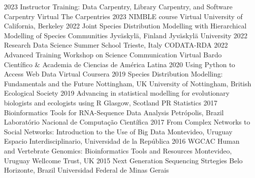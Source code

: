 \documentclass[9pt]{developercv} %
\begin{document}


\begin{entrylist}
	\entrylong
		{2023}
		{Instructor Training: Data Carpentry, Library Carpentry, and Software Carpentry}
		{Virtual}
		{The Carpentries}
	\entrylong
		{2023}
		{NIMBLE course}
		{Virtual}
		{University of California, Berkeley}
	\entrylong
		{2022}
		{Joint Species Distribution Modelling with Hierarchical Modelling of Species Communities}
		{Jyväskylä, Finland}
		{Jyväskylä University}	
	\entrylong
		{2022}
		{Research Data Science Summer School}
		{Trieste, Italy}
		{CODATA-RDA}	
	\entrylong
		{2022}
		{Advanced Training Workshop on Science Communication}
		{Virtual}
		{Bardo Científico \& Academia de Ciencias de América Latina}	
	\entrylong
		{2020}
		{Using Python to Access Web Data}
		{Virtual}
		{Coursera}	
	\entrylong
		{2019}
		{Species Distribution Modelling: Fundamentals and the Future}
		{Nottingham, UK}
		{University of Nottingham, British Ecological Society}	
	\entrylong
		{2019}
		{Advancing in statistical modelling for evolutionary biologists and ecologists using R}
		{Glasgow, Scotland}
		{PR Statistics}	
	\entrylong
		{2017}
		{Bioinformatics Tools for RNA-Sequence Data Analysis}
		{Petrópolis, Brazil}
		{Laboratório Nacional de Computação Científica}
	\entrylong
		{2017}
		{From Complex Networks to Social Networks: Introduction to the Use of Big Data}
		{Montevideo, Uruguay}
		{Espacio Interdisciplinario, Universidad de la República}
	\entrylong
		{2016}
		{WGCAC Human and Vertebrate Genomics: Bioinformatics Tools and Resources}
		{Montevideo, Uruguay}
		{Wellcome Trust, UK}
	\entrylong
		{2015}
		{Next Generation Sequencing Strtegies}
		{Belo Horizonte, Brazil}
		{Universidad Federal de Minas Gerais}

\end{entrylist}


\end{document}
